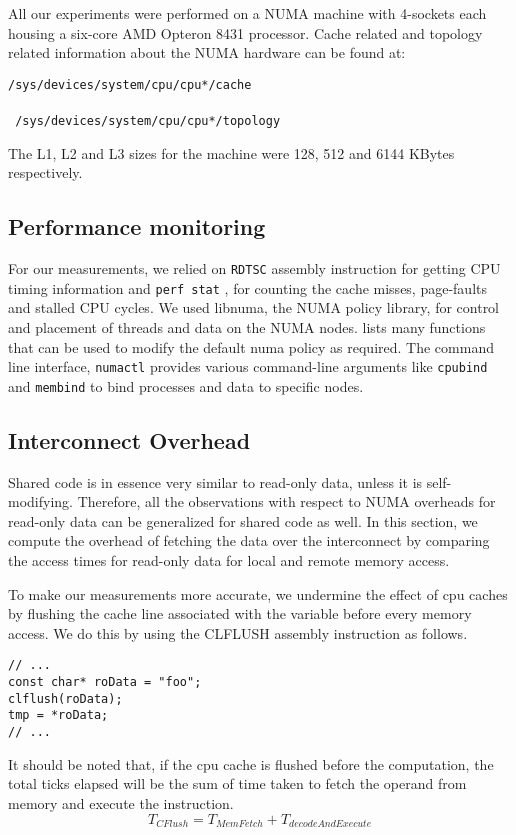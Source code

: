 
All our experiments were performed on a NUMA machine with 4-sockets each housing a six-core AMD Opteron 8431 processor.\cite{opteron}
Cache related and topology related information about the NUMA hardware can be found at:

\texttt{/sys/devices/system/cpu/cpu*/cache } \\
\\
\texttt{ /sys/devices/system/cpu/cpu*/topology }

The L1, L2 and L3 sizes for the machine were 128, 512 and 6144 KBytes respectively.

\subsection{Performance monitoring}
For our measurements, we relied on \texttt{RDTSC} assembly instruction\cite{timeStampCounter} for getting CPU timing information
and \texttt{perf stat} \cite{perfWiki}, for counting the cache misses, page-faults and stalled CPU cycles. We used libnuma,
the NUMA policy library, for control and placement of threads and data on the NUMA nodes. \cite{libNuma} lists many functions
that can be used to modify the default numa policy as required. The command line interface, \texttt{numactl} \cite{numactl} 
provides various command-line arguments like \texttt{cpubind} and \texttt{membind} to bind processes and data to specific nodes.

\subsection{Interconnect Overhead}
Shared code is in essence very similar to read-only data, unless it is self-modifying.
Therefore, all the observations with respect to NUMA overheads for read-only data can be generalized for shared code as well.
In this section, we compute the overhead of fetching the data over the interconnect by comparing the access times for read-only
data for local and remote memory access.

To make our measurements more accurate, we undermine the effect of cpu caches by flushing the cache line associated with the 
variable before every memory access. We do this by using the CLFLUSH\cite{clflush} assembly instruction as follows.
\begin{verbatim}
// ...
const char* roData = "foo";
clflush(roData);
tmp = *roData;
// ...
\end{verbatim}

It should be noted that, if the cpu cache is flushed before the computation, the total ticks elapsed will be the sum of time 
taken to fetch the operand from memory and execute the instruction.
\begin{dmath}
\label{eqn:NoCacheFetch}
T_{CFlush} = T_{MemFetch} + T_{decodeAndExecute}
\end{dmath}

